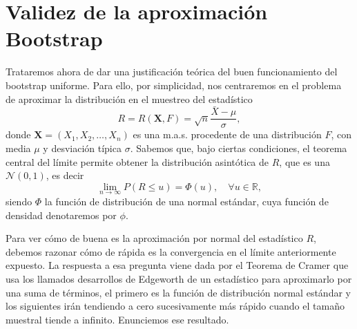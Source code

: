 \documentclass[
]{book}
\theoremstyle{break}
\theoremstyle{definition}
\theoremstyle{definition}
\theoremstyle{definition}
\theoremstyle{definition}
\theoremstyle{remark}
\begin{document}
\hypertarget{validez-de-la-aproximaciuxf3n-bootstrap}{%
\section{Validez de la aproximación Bootstrap}\label{validez-de-la-aproximaciuxf3n-bootstrap}}

Trataremos ahora de dar una justificación teórica del buen
funcionamiento del bootstrap uniforme. Para ello, por simplicidad, nos
centraremos en el problema de aproximar la distribución en el muestreo
del estadístico
\[R=R\left( \mathbf{X},F \right) =\sqrt{n}\frac{\bar{X}-\mu }{\sigma },\]
donde \(\mathbf{X}=\left( X_1,X_2,\ldots ,X_n \right)\) es una
m.a.s. procedente de una distribución \(F\), con media \(\mu\) y desviación
típica \(\sigma\). Sabemos que, bajo ciertas condiciones, el teorema
central del límite permite obtener la distribución asintótica de \(R\),
que es una \(\mathcal{N}\left( 0,1 \right)\), es decir
\[\lim_{n\rightarrow \infty }P\left( R\leq u \right) =\Phi \left( u \right),
\quad\forall u\in \mathbb{R},\]
siendo \(\Phi\) la función de distribución de una normal estándar, cuya
función de densidad denotaremos por \(\phi\).

Para ver cómo de buena es la aproximación por normal del estadístico
\(R\), debemos razonar cómo de rápida es la convergencia en el límite
anteriormente expuesto. La respuesta a esa pregunta viene dada por el
Teorema de Cramer que usa los llamados desarrollos de Edgeworth de un
estadístico para aproximarlo por una suma de términos, el primero es la
función de distribución normal estándar y los siguientes irán tendiendo
a cero sucesivamente más rápido cuando el tamaño muestral tiende a
infinito. Enunciemos ese resultado.
\end{document}
